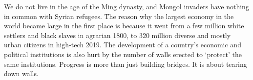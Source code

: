    We do not live in the age of the Ming dynasty, and Mongol invaders have
   nothing in common with Syrian refugees. The reason why the largest
   economy in the world became large in the first place is because it went
   from a few million white settlers and black slaves in agrarian 1800, to
   320 million diverse and mostly urban citizens in high-tech 2019. The
   development of a country's economic and political institutions is also
   hurt by the number of walls erected to `protect' the same institutions.
   Progress is more than just building bridges. It is about tearing down
   walls.

\renewcommand{\initial}[1]{%
     \lettrine[lines=3,lraise=0.18,lhang=0.33,findent=5pt,nindent=0em]{
     				\color{rooseveltblue}
     				{\textsf{#1}}}{}}
